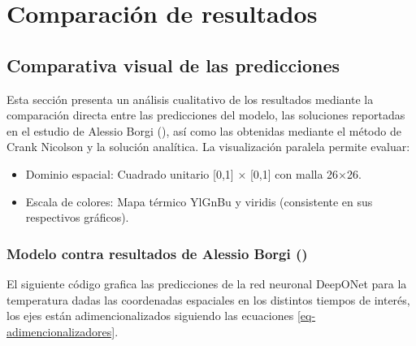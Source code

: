 \documentclass[
  spanish,
  us-letterpaper,
]{scrreprt}
\providecommand{\tightlist}{%
  \setlength{\itemsep}{0pt}\setlength{\parskip}{0pt}}
\theoremstyle{definition}
\theoremstyle{plain}
\theoremstyle{remark}
\begin{document}
\chapter{Comparación de
resultados}\label{comparaciuxf3n-de-resultados-1}

\section{Comparativa visual de las
predicciones}\label{comparativa-visual-de-las-predicciones}

Esta sección presenta un análisis cualitativo de los resultados mediante
la comparación directa entre las predicciones del modelo, las soluciones
reportadas en el estudio de Alessio Borgi
(), así como las obtenidas mediante el
método de Crank Nicolson y la solución analítica. La visualización
paralela permite evaluar:

\begin{itemize}
\tightlist
\item
  Dominio espacial: Cuadrado unitario {[}0,1{]} × {[}0,1{]} con malla
  26×26.
\item
  Escala de colores: Mapa térmico YlGnBu y viridis (consistente en sus
  respectivos gráficos).
\end{itemize}

\subsection{\texorpdfstring{Modelo contra resultados de Alessio Borgi
()}{Modelo contra resultados de Alessio Borgi (2023)}}\label{modelo-contra-resultados-de-medical_rep}

El siguiente código grafica las predicciones de la red neuronal DeepONet
para la temperatura dadas las coordenadas espaciales en los distintos
tiempos de interés, los ejes están adimencionalizados siguiendo las
ecuaciones \ref{eq-adimencionalizadores}.
\end{document}
